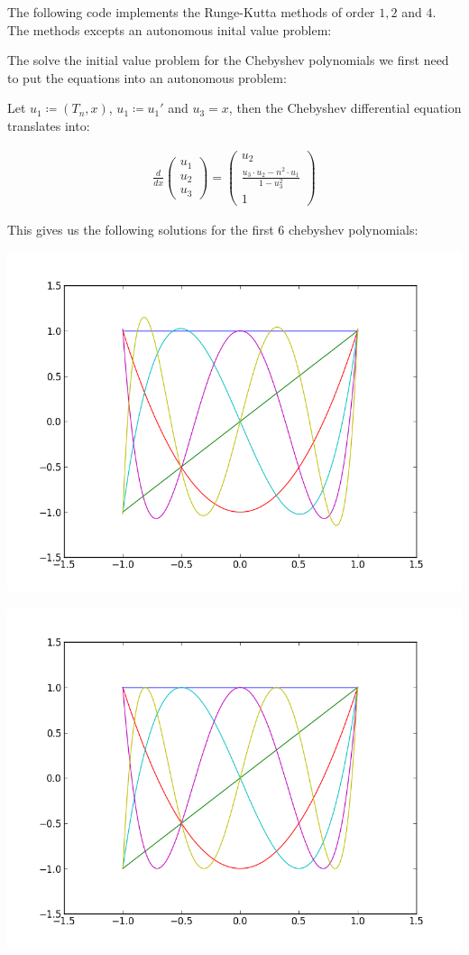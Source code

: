 \documentclass[%
]
{scrartcl}
\theoremstyle{plain}
\begin{document}
The following code implements the Runge-Kutta methods of order $1, 2$ and $4$. The methods excepts an autonomous inital value problem:



The solve the initial value problem for the Chebyshev polynomials we first need to put the equations into an autonomous problem:

Let $u_{1}\coloneqq (T_{n}, x)$, $u_{1}\coloneqq u_{1}'$ and $u_{3}=x$, then the Chebyshev differential equation translates into:

\begin{eqnarray*}
\frac{d}{dx}\begin{pmatrix}u_{1}\\u_{2}\\u_{3}\end{pmatrix}=\begin{pmatrix}u_{2}\\\frac{u_{3}\cdot u_{2}-n^{2}\cdot u_{1}}{1-u_{3}^{2}}\\1\end{pmatrix}
\end{eqnarray*}

This gives us the following solutions for the first 6 chebyshev polynomials:

\begin{center}
\centering
\includegraphics[width=0.6\linewidth]{../chebyshev_rk1.png}
\end{center}

\begin{center}
\centering
\includegraphics[width=0.6\linewidth]{../chebyshev_rk2.png}
\end{center}
\end{document}

